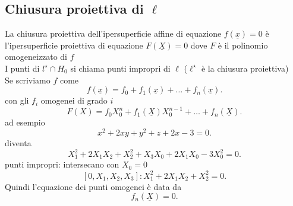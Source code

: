 \documentclass[12px]{article}
\begin{document}
	\subsection {Chiusura proiettiva di $\ell$ }
	La chiusura proiettiva dell'ipersuperficie affine di equazione $f(\underline x) =0$ è l'ipersuperficie proiettiva di equazione  $F(\underline X)=0$ dove  $F$ è il polinomio omogeneizzato  di $f$\\
	I punti di  $l^\star \cap H_0$ si chiama punti impropri di $\ell$ ($\ell^\star$ è la chiusura proiettiva)\\
	Se scriviamo $f$ come\\
	\[
	 f(\underline x) = f_0 + f_1(\underline x) + \ldots + f_n(\underline x)
	.\] 
	con gli $f_i$ omogenei di grado $i$
	 \[
		 F(X) = f_0 X_0^n + f_1(\underline X)X_0^{n-1}+\ldots+f_n(\underline X)
	.\] 
	ad esempio
	\[
	x^2 + 2xy + y^2 + z+ 2x-3 = 0
	.\] 
	diventa
	\[
	X_1^2 + 2X_1X_2 + X_2^2 +X_3X_0 + 2X_1X_0-3X_0^2=0
	.\] 
	punti impropri: intersecano con $X_0 =0 $\\
	\[
		[0,X_1,X_2,X_3]:X_1^2 + 2X_1X_2 + X_2^2 =0 
	.\] 
	Quindi l'equazione dei punti omogenei è data da 
	\[
	 f_n(\underline X) = 0
	.\] 
\end{document}
